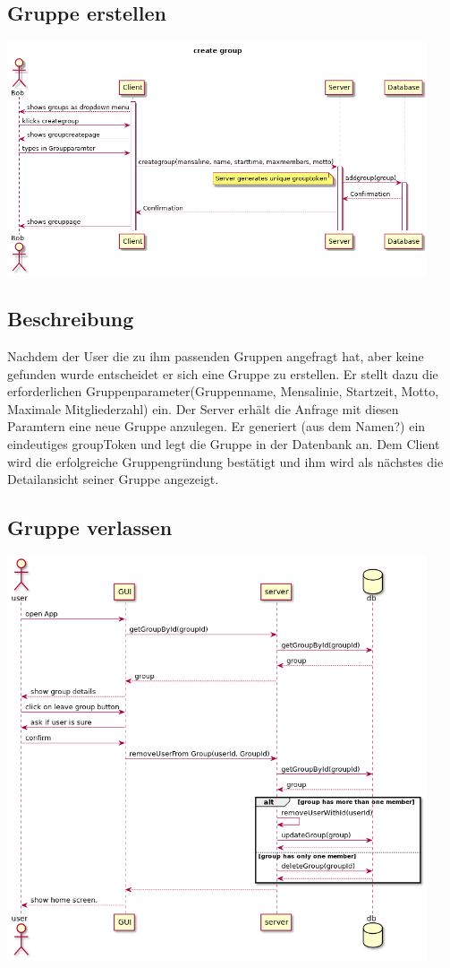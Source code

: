 \documentclass[a4paper]{scrreprt}
\begin{document}
\newpage
\subsection{Gruppe erstellen}
\begin{center}
\includegraphics[width=0.93\textwidth]{Sequenzdiagramme/CreateGroup.png}

\end{center}
\subsection*{Beschreibung}
Nachdem der User die zu ihm passenden Gruppen angefragt hat, aber keine gefunden wurde entscheidet er sich eine Gruppe zu erstellen. Er stellt dazu die erforderlichen Gruppenparameter(Gruppenname, Mensalinie, Startzeit, Motto, Maximale Mitgliederzahl) ein. Der Server erhält die Anfrage mit diesen Paramtern eine neue Gruppe anzulegen. Er generiert (aus dem Namen?) ein eindeutiges groupToken und legt die Gruppe in der Datenbank an. Dem Client wird die erfolgreiche Gruppengründung bestätigt und ihm wird als nächstes die Detailansicht seiner Gruppe angezeigt.

\newpage
\subsection{Gruppe verlassen}
\begin{center}
	\includegraphics[width=0.93\textwidth]{Sequenzdiagramme/leaveGroupSD.png}
\end{center}
\end{document}
